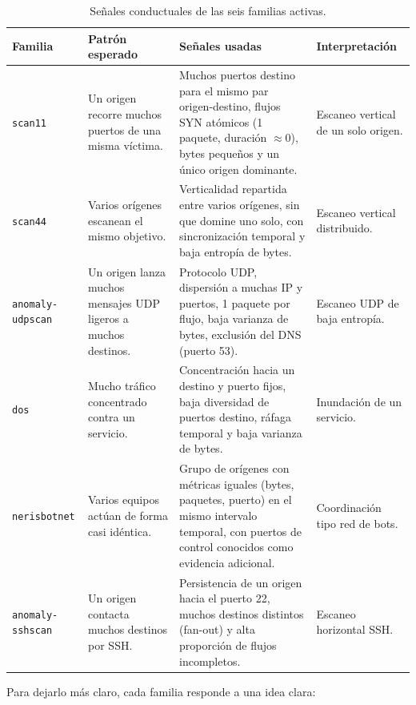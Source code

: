 \begin{table}[ht]
\centering
\scriptsize
\setlength{\tabcolsep}{4pt}
\begin{tabular}{|l|p{3.2cm}|p{5.0cm}|p{3.0cm}|}
\hline
\textbf{Familia} & \textbf{Patrón esperado} & \textbf{Señales usadas} & \textbf{Interpretación} \\
\hline
\texttt{scan11} & Un origen recorre muchos puertos de una misma víctima. & Muchos puertos destino para el mismo par origen-destino, flujos SYN atómicos (1 paquete, duración $\approx$0), bytes pequeños y un único origen dominante. & Escaneo vertical de un solo origen. \\
\hline
\texttt{scan44} & Varios orígenes escanean el mismo objetivo. & Verticalidad repartida entre varios orígenes, sin que domine uno solo, con sincronización temporal y baja entropía de bytes. & Escaneo vertical distribuido. \\
\hline
\texttt{anomaly-udpscan} & Un origen lanza muchos mensajes UDP ligeros a muchos destinos. & Protocolo UDP, dispersión a muchas IP y puertos, 1 paquete por flujo, baja varianza de bytes, exclusión del DNS (puerto 53). & Escaneo UDP de baja entropía. \\
\hline
\texttt{dos} & Mucho tráfico concentrado contra un servicio. & Concentración hacia un destino y puerto fijos, baja diversidad de puertos destino, ráfaga temporal y baja varianza de bytes. & Inundación de un servicio. \\
\hline
\texttt{nerisbotnet} & Varios equipos actúan de forma casi idéntica. & Grupo de orígenes con métricas iguales (bytes, paquetes, puerto) en el mismo intervalo temporal, con puertos de control conocidos como evidencia adicional. & Coordinación tipo red de bots. \\
\hline
\texttt{anomaly-sshscan} & Un origen contacta muchos destinos por SSH. & Persistencia de un origen hacia el puerto 22, muchos destinos distintos (fan-out) y alta proporción de flujos incompletos. & Escaneo horizontal SSH. \\
\hline
\end{tabular}
\caption{Señales conductuales de las seis familias activas.}
\label{tab:senales}
\end{table}

Para dejarlo más claro, cada familia responde a una idea clara:

